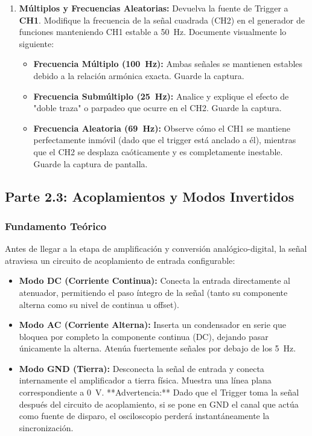 \documentclass[12pt, letterpaper]{article}
\begin{document}
\begin{enumerate}[label=\textbf{2.2.\alph*)}]
    \item \textbf{Múltiplos y Frecuencias Aleatorias:} Devuelva la fuente de Trigger a \textbf{CH1}. Modifique la frecuencia de la señal cuadrada (CH2) en el generador de funciones manteniendo CH1 estable a \SI{50}{Hz}. Documente visualmente lo siguiente:
    \begin{itemize}
        \item \textbf{Frecuencia Múltiplo (\SI{100}{Hz}):} Ambas señales se mantienen estables debido a la relación armónica exacta. Guarde la captura.
        \item \textbf{Frecuencia Submúltiplo (\SI{25}{Hz}):} Analice y explique el efecto de "doble traza" o parpadeo que ocurre en el CH2. Guarde la captura.
        \item \textbf{Frecuencia Aleatoria (\SI{69}{Hz}):} Observe cómo el CH1 se mantiene perfectamente inmóvil (dado que el trigger está anclado a él), mientras que el CH2 se desplaza caóticamente y es completamente inestable. Guarde la captura de pantalla.
    \end{itemize}
\end{enumerate}

\subsection{Parte 2.3: Acoplamientos y Modos Invertidos}

\subsubsection*{Fundamento Teórico}
Antes de llegar a la etapa de amplificación y conversión analógico-digital, la señal atraviesa un circuito de acoplamiento de entrada configurable:
\begin{itemize}[noitemsep, topsep=0pt]
    \item \textbf{Modo DC (Corriente Continua):} Conecta la entrada directamente al atenuador, permitiendo el paso íntegro de la señal (tanto su componente alterna como su nivel de continua u offset).
    \item \textbf{Modo AC (Corriente Alterna):} Inserta un condensador en serie que bloquea por completo la componente continua (DC), dejando pasar únicamente la alterna. Atenúa fuertemente señales por debajo de los \SI{5}{Hz}.
    \item \textbf{Modo GND (Tierra):} Desconecta la señal de entrada y conecta internamente el amplificador a tierra física. Muestra una línea plana correspondiente a \SI{0}{\volt}. **Advertencia:** Dado que el Trigger toma la señal después del circuito de acoplamiento, si se pone en GND el canal que actúa como fuente de disparo, el osciloscopio perderá instantáneamente la sincronización.
\end{itemize}
\end{document}
